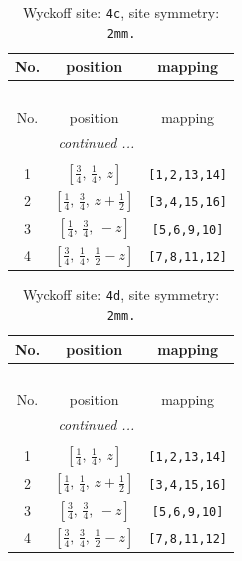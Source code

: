 \documentclass[fleqn,8pt]{jsarticle}
\begin{document}
\renewcommand{\arraystretch}{1.2}
\begin{longtable}{ccc}
\caption{Wyckoff site: {\tt 4c}, site symmetry: {\tt 2mm.}}
 \\
 \hline \hline
No. & position & mapping \\ \hline \endfirsthead

\multicolumn{2}{l}{\tablename\ \thetable{}} \\
 \hline \hline
No. & position & mapping \\ \hline \endhead

 \hline \hline
\multicolumn{2}{r}{\footnotesize\it continued ...} \\ \endfoot

 \hline \hline
\multicolumn{2}{r}{} \\ \endlastfoot

1 & $\left[ \frac{3}{4},\, \frac{1}{4},\, z \right]$ & {\tt [1,2,13,14]} \\ \hline
2 & $\left[ \frac{1}{4},\, \frac{3}{4},\, z + \frac{1}{2} \right]$ & {\tt [3,4,15,16]} \\ \hline
3 & $\left[ \frac{1}{4},\, \frac{3}{4},\, - z \right]$ & {\tt [5,6,9,10]} \\ \hline
4 & $\left[ \frac{3}{4},\, \frac{1}{4},\, \frac{1}{2} - z \right]$ & {\tt [7,8,11,12]} \\
\end{longtable}
\renewcommand{\arraystretch}{1.2}
\begin{longtable}{ccc}
\caption{Wyckoff site: {\tt 4d}, site symmetry: {\tt 2mm.}}
 \\
 \hline \hline
No. & position & mapping \\ \hline \endfirsthead

\multicolumn{2}{l}{\tablename\ \thetable{}} \\
 \hline \hline
No. & position & mapping \\ \hline \endhead

 \hline \hline
\multicolumn{2}{r}{\footnotesize\it continued ...} \\ \endfoot

 \hline \hline
\multicolumn{2}{r}{} \\ \endlastfoot

1 & $\left[ \frac{1}{4},\, \frac{1}{4},\, z \right]$ & {\tt [1,2,13,14]} \\ \hline
2 & $\left[ \frac{1}{4},\, \frac{1}{4},\, z + \frac{1}{2} \right]$ & {\tt [3,4,15,16]} \\ \hline
3 & $\left[ \frac{3}{4},\, \frac{3}{4},\, - z \right]$ & {\tt [5,6,9,10]} \\ \hline
4 & $\left[ \frac{3}{4},\, \frac{3}{4},\, \frac{1}{2} - z \right]$ & {\tt [7,8,11,12]} \\
\end{longtable}
\end{document}
